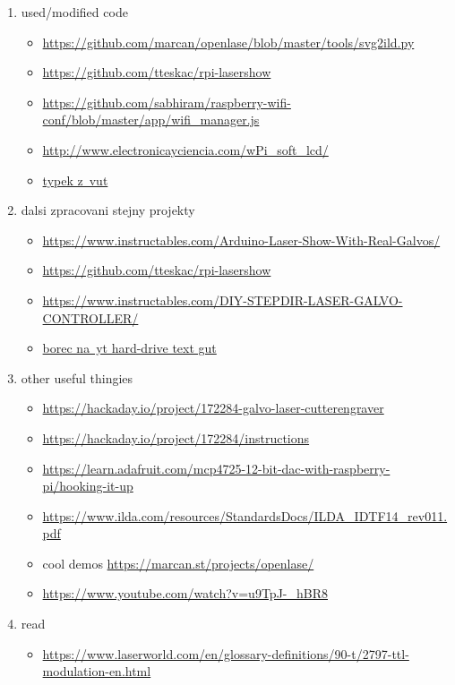 \begin{enumerate}
  \item used/modified code
        \begin{itemize}
          \item \url{https://github.com/marcan/openlase/blob/master/tools/svg2ild.py}
          \item \url{https://github.com/tteskac/rpi-lasershow}
          \item \url{https://github.com/sabhiram/raspberry-wifi-conf/blob/master/app/wifi\_manager.js}
          \item \url{http://www.electronicayciencia.com/wPi_soft_lcd/}
          \item \href{https://dspace.vutbr.cz/bitstream/handle/11012/38621/final-thesis.pdf?sequence=-1}{typek z~vut}
        \end{itemize}
  \item dalsi zpracovani stejny projekty
        \begin{itemize}
          \item \url{https://www.instructables.com/Arduino-Laser-Show-With-Real-Galvos/}
          \item \url{https://github.com/tteskac/rpi-lasershow}
          \item \url{https://www.instructables.com/DIY-STEPDIR-LASER-GALVO-CONTROLLER/}
          \item \href{https://youtu.be/u9TpJ-_hBR8?si=mHy-UrptZZJ0Xu5-}{borec na~yt hard-drive text gut}
        \end{itemize}
  \item other useful thingies
        \begin{itemize}
          \item \url{https://hackaday.io/project/172284-galvo-laser-cutterengraver}

          \item \url{https://hackaday.io/project/172284/instructions}

          \item \url{https://learn.adafruit.com/mcp4725-12-bit-dac-with-raspberry-pi/hooking-it-up}
          \item \url{https://www.ilda.com/resources/StandardsDocs/ILDA_IDTF14_rev011.pdf}
          \item cool demos \url{https://marcan.st/projects/openlase/}
          \item \url{https://www.youtube.com/watch?v=u9TpJ-_hBR8}
        \end{itemize}
  \item read
        \begin{itemize}
          \item \url{https://www.laserworld.com/en/glossary-definitions/90-t/2797-ttl-modulation-en.html}
        \end{itemize}

\end{enumerate}
